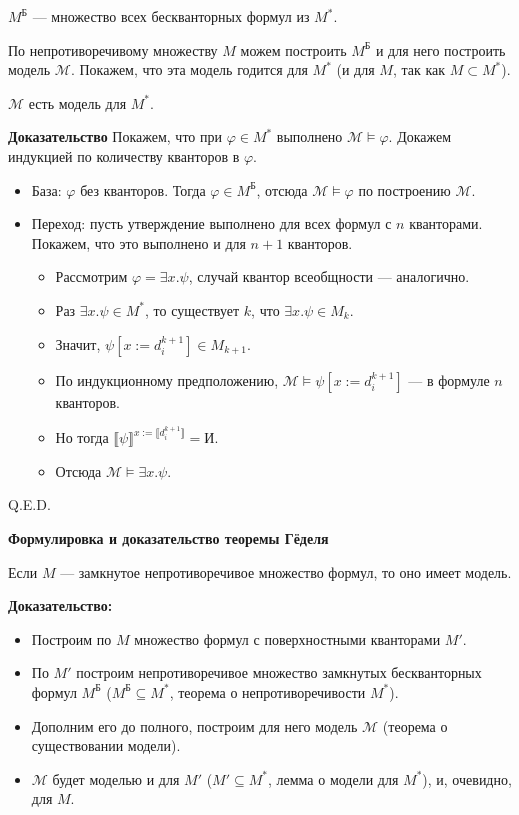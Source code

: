  $M^\text{Б}$ --- множество всех бескванторных формул из $M^*$.

По непротиворечивому множеству $M$ можем построить $M^\text{Б}$ и для него построить модель $\mathcal{M}$.
Покажем, что эта модель годится для $M^*$ (и для $M$, так как $M \subset M^*$).

$\mathcal{M}$ есть модель для $M^*$.

\textbf{Доказательство}
Покажем, что при $\varphi\in M^*$ выполнено $\mathcal{M}\models\varphi$. Докажем индукцией по количеству кванторов в $\varphi$.
\begin{itemize}
\item База: $\varphi$ без кванторов. Тогда $\varphi\in M^\text{Б}$, отсюда $\mathcal{M}\models\varphi$ по построению $\mathcal{M}$.
\item Переход: пусть утверждение выполнено для всех формул с $n$ кванторами. Покажем, что это выполнено и для $n+1$ кванторов.
\begin{itemize}
\item Рассмотрим $\varphi = \exists x.\psi$, случай квантор всеобщности --- аналогично.

\item Раз $\exists x.\psi \in M^*$, то существует $k$, что $\exists x.\psi \in M_k$.
\item Значит, $\psi[x := d^{k+1}_i] \in M_{k+1}$. 
\item По индукционному предположению, $\mathcal{M}\models\psi[x := d^{k+1}_i]$ --- в формуле $n$ кванторов.
\item Но тогда $\llbracket \psi \rrbracket^{x := \llbracket d^{k+1}_i\rrbracket} = \text{И}$.
\item Отсюда $\mathcal{M}\models\exists x.\psi$.
\end{itemize}
\end{itemize}
\hfill Q.E.D.

\textbf{Формулировка и доказательство теоремы Гёделя}


Если $M$ --- замкнутое непротиворечивое множество формул, то оно имеет модель.

\textbf{Доказательство:}
\begin{itemize}
\item Построим по $M$ множество формул с поверхностными кванторами $M'$.
\item По $M'$ построим непротиворечивое множество замкнутых бескванторных формул $M^\text{Б}$ ($M^\text{Б}\subseteq M^*$, теорема о непротиворечивости $M^*$).
\item Дополним его до полного, построим для него модель $\mathcal{M}$ (теорема о существовании модели).
\item $\mathcal{M}$ будет моделью и для $M'$ ($M'\subseteq M^*$, лемма о модели для $M^*$), и, очевидно, для $M$.
\end{itemize}



